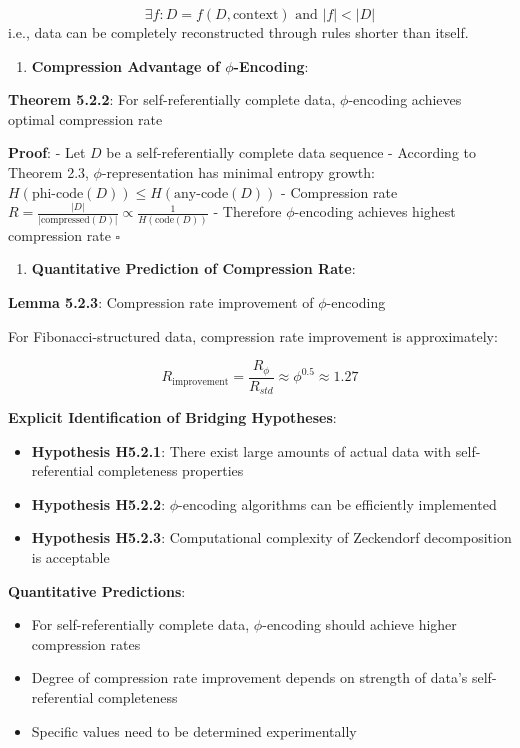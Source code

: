 \begin{equation}
\exists f: D = f(D, \text{context}) \text{ and } |f| < |D|
\end{equation}
   i.e., data can be completely reconstructed through rules shorter than itself.

\begin{enumerate}
\item \textbf{Compression Advantage of $\phi$-Encoding}:
\end{enumerate}
   \textbf{Theorem 5.2.2}: For self-referentially complete data, $\phi$-encoding achieves optimal compression rate
\label{thm:5.2.2}
   
   \textbf{Proof}:
   - Let $D$ be a self-referentially complete data sequence
   - According to Theorem 2.3, $\phi$-representation has minimal entropy growth: $H(\text{phi-code}(D)) \leq H(\text{any-code}(D))$
   - Compression rate $R = \frac{|D|}{|\text{compressed}(D)|} \propto \frac{1}{H(\text{code}(D))}$
   - Therefore $\phi$-encoding achieves highest compression rate $\square$

\begin{enumerate}
\item \textbf{Quantitative Prediction of Compression Rate}:
\end{enumerate}
   \textbf{Lemma 5.2.3}: Compression rate improvement of $\phi$-encoding
\label{lemma:5.2.3}
   
   For Fibonacci-structured data, compression rate improvement is approximately:
   
\begin{equation}
R_{\text{improvement}} = \frac{R_\phi}{R_{std}} \approx \phi^{0.5} \approx 1.27
\end{equation}

\textbf{Explicit Identification of Bridging Hypotheses}:
\begin{itemize}
\item \textbf{Hypothesis H5.2.1}: There exist large amounts of actual data with self-referential completeness properties
\item \textbf{Hypothesis H5.2.2}: $\phi$-encoding algorithms can be efficiently implemented
\item \textbf{Hypothesis H5.2.3}: Computational complexity of Zeckendorf decomposition is acceptable
\end{itemize}

\textbf{Quantitative Predictions}:
\begin{itemize}
\item For self-referentially complete data, $\phi$-encoding should achieve higher compression rates
\item Degree of compression rate improvement depends on strength of data's self-referential completeness
\item Specific values need to be determined experimentally
\end{itemize}

